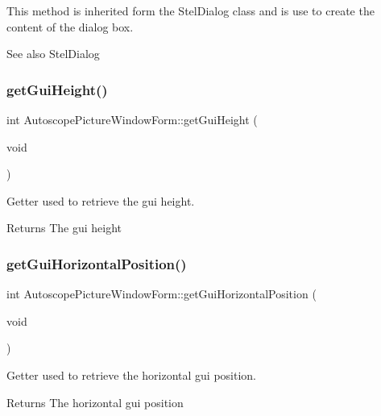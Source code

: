 This method is inherited form the Stel\+Dialog class and is use to create the content of the dialog box. 

\begin{DoxySeeAlso}{See also}
Stel\+Dialog 
\end{DoxySeeAlso}
\mbox{\label{class_autoscope_picture_window_form_ad3fa8efcfcc0631f8b646500fb5cea65}} 
\subsubsection{\texorpdfstring{getGuiHeight()}{getGuiHeight()}}
{\footnotesize\ttfamily int Autoscope\+Picture\+Window\+Form\+::get\+Gui\+Height (\begin{DoxyParamCaption}\item[{void}]{ }\end{DoxyParamCaption})}



Getter used to retrieve the gui height. 

\begin{DoxyReturn}{Returns}
The gui height 
\end{DoxyReturn}
\mbox{\label{class_autoscope_picture_window_form_ad9fa74865956b50029f0e2692ab256c8}} 
\subsubsection{\texorpdfstring{getGuiHorizontalPosition()}{getGuiHorizontalPosition()}}
{\footnotesize\ttfamily int Autoscope\+Picture\+Window\+Form\+::get\+Gui\+Horizontal\+Position (\begin{DoxyParamCaption}\item[{void}]{ }\end{DoxyParamCaption})}



Getter used to retrieve the horizontal gui position. 

\begin{DoxyReturn}{Returns}
The horizontal gui position 
\end{DoxyReturn}
\mbox{\label{class_autoscope_picture_window_form_ad7eeabfc680448ec5f663f7c68f6e3f4}} 
